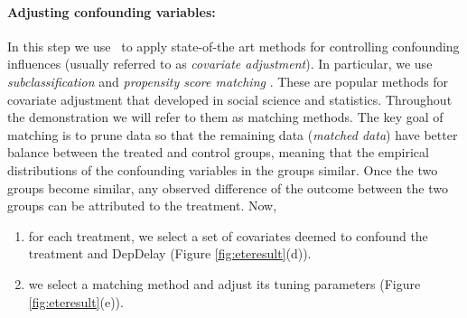  \paragraph{\bf Adjusting confounding variables:}
In this step we use \GSQL\ to apply state-of-the art methods for controlling confounding influences (usually referred to as {\em covariate adjustment}).
In particular, we use {\em subclassification} and {\it propensity score matching} \cite{Rubin1983b,IacKinPor09,rosenbaum1984reducing}.
These are popular methods for  covariate adjustment that developed in social science and statistics. Throughout the demonstration we will refer to them as matching methods.
The key goal of matching is to prune data so that
the remaining data ({\em matched data}) have better balance between the treated and control groups, meaning that the empirical distributions of the confounding variables in the groups  similar. 
Once the two groups become similar, any observed difference of the outcome between the two groups can be attributed to the treatment. Now,
     \begin{enumerate}
      \item for each treatment, we select a set of covariates deemed to confound the treatment and DepDelay (Figure \ref{fig:eteresult}(d)).
      \item we select a matching method and adjust its tuning parameters (Figure \ref{fig:eteresult}(e)).
\end{enumerate}

